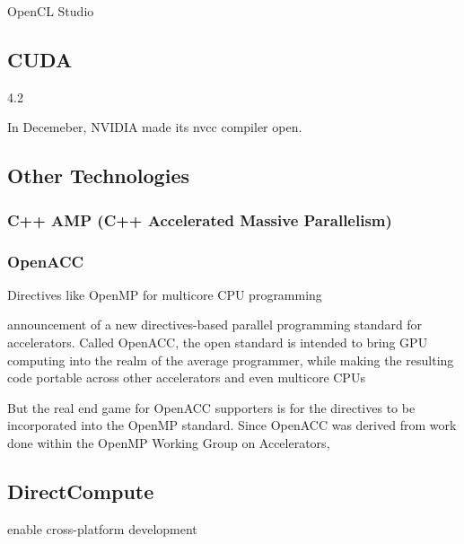OpenCL Studio


\subsection{CUDA}

4.2

In Decemeber, NVIDIA made its nvcc compiler open.

\subsection{Other Technologies}
\subsubsection{C++ AMP (C++ Accelerated Massive Parallelism)}


\subsubsection{OpenACC}
Directives like OpenMP for multicore CPU programming

announcement of a new directives-based parallel programming standard for accelerators.  Called OpenACC, the open standard is intended to bring GPU computing into the realm of the average programmer, while making the resulting code portable across other accelerators and even multicore CPUs

But the real end game for OpenACC supporters is for the directives to be incorporated into the OpenMP standard.  Since OpenACC was derived from work done within the OpenMP Working Group on Accelerators,

\subsection{DirectCompute}
enable cross-platform development

